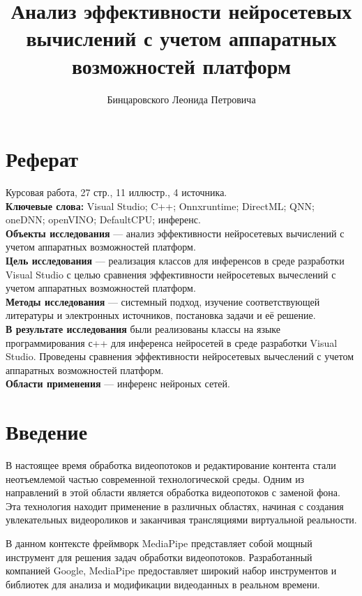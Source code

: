 \documentclass[a4paper,14pt]{extreport}
\title{Анализ эффективности нейросетевых вычислений с учетом аппаратных возможностей платформ}
\author{Бинцаровского Леонида Петровича}
\begin{document}
    \maketitle\newpage
    
    \chapter*{Реферат}
    Курсовая работа, 27 стр., 11 иллюстр., 4 источника.\\
    \textbf{Ключевые слова:} Visual Studio; C++; Onnxruntime; DirectML; QNN; oneDNN; openVINO; DefaultCPU; инференс.\\
    \textbf{Объекты исследования} — анализ эффективности нейросетевых вычислений с учетом аппаратных возможностей платформ.\\
    \textbf{Цель исследования} — реализация классов для инференсов в среде разработки Visual Studio с целью сравнения эффективности нейросетевых вычеслений с учетом аппаратных возможностей платформ.\\
    \textbf{Методы исследования} — системный подход, изучение соответствующей литературы и электронных источников, постановка задачи и её решение.\\
    \textbf{В результате исследования} были реализованы классы на языке программирования с++ для инференса нейросетей в среде разработки Visual Studio. Проведены сравнения эффективности нейросетевых вычеслений с учетом аппаратных возможностей платформ.\\
    \textbf{Области применения} — инференс нейроных сетей.
    
    \tableofcontents\newpage
    \chapter*{Введение}
    В настоящее время обработка видеопотоков и редактирование контента стали неотъемлемой частью современной технологической среды. Одним из направлений в этой области является обработка видеопотоков с заменой фона. Эта технология находит применение в различных областях, начиная с создания увлекательных видеороликов и заканчивая трансляциями виртуальной реальности.

    В данном контексте фреймворк MediaPipe представляет собой мощный инструмент для решения задач обработки видеопотоков. Разработанный компанией Google, MediaPipe предоставляет широкий набор инструментов и библиотек для анализа и модификации видеоданных в реальном времени.
\end{document}
